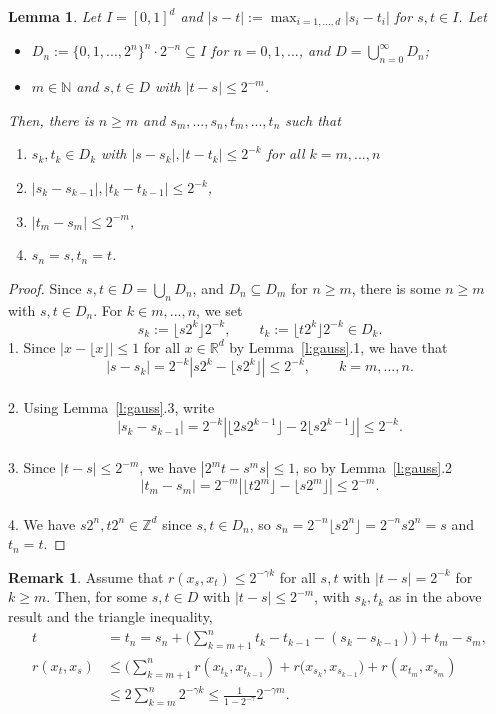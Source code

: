 \documentclass{article}
\newtheorem{lemma}[proposition]{Lemma}
\theoremstyle{definition}
\newtheorem{remark}[proposition]{Remark}
\theoremstyle{step} \newtheorem{step}{Step}
\begin{document}
\begin{lemma}
  Let $I = [0,1]^d$ and $|s-t| := \max_{i=1,...,d} |s_i - t_i|$ for
  $s,t\in I$. Let
  \begin{itemize}
    \item $D_n := \{0,1,...,2^n\}^n \cdot 2^{-n} \subseteq I$ for
          $n=0,1,...$, and $D =\bigcup_{n=0}^\infty D_n$;
    \item $m \in \mathbb N$ and $s,t \in D$ with $|t-s| \leq 2^{-m}$.
  \end{itemize}
  Then, there is $n \geq m$ and $s_m,...,s_n, t_m,...,t_n$ such that
  \begin{enumerate}
    \item $s_k, t_k \in D_k$ with $|s-s_k|, |t-t_k| \leq 2^{-k}$ for all
          $k=m,...,n$
    \item $|s_k - s_{k-1}|, |t_k - t_{k-1}| \leq 2^{-k}$,
    \item $|t_m - s_m| \leq 2^{-m}$,
    \item $s_n=s, t_n=t$.
  \end{enumerate}
\end{lemma}

\begin{proof}
  Since $s,t \in D = \bigcup_n D_n$, and $D_n \subseteq D_m$ for
  $n\geq m$, there is some $n \geq m$ with $s,t\in D_n$. For $k \in
    m,...,n$, we set
  $$s_k := \lfloor s2^k\rfloor 2^{-k}, \qquad t_k := \lfloor
    t2^k\rfloor 2^{-k} \in D_k.$$ 1.  Since $|x - \lfloor x \rfloor |
    \leq 1$ for all $x \in \mathbb R^d$ by Lemma~\ref{l:gauss}.1, we have that
  $$|s - s_k| = 2^{-k}|s2^k - \lfloor s2^k\rfloor| \leq 2^{-k}, \qquad
    k=m,...,n.$$ \\ 2. Using Lemma~\ref{l:gauss}.3, write
  $$ |s_k - s_{k-1}| = 2^{-k} | \lfloor 2s2^{k-1}\rfloor - 2\lfloor
    s2^{k-1}\rfloor| \leq 2^{-k}.$$ \\ 3. Since  $|t-s| \leq
    2^{-m}$, we have $|2^mt - s^ms| \leq 1$, so by Lemma~\ref{l:gauss}.2
  $$ |t_m - s_m| = 2^{-m} | \lfloor t2^m\rfloor - \lfloor s2^m
    \rfloor| \leq 2^{-m}.$$ \\ 4. We have $s2^n, t2^n \in \mathbb Z^d$
  since $s,t \in D_n$, so $s_n = 2^{-n} \lfloor s2^n\rfloor = 2^{-n} s
    2^n = s$ and $t_n = t$.
\end{proof}

\begin{remark}\label{rem1}
  Assume that $r(x_s, x_t) \leq 2^{-\gamma k}$ for all $s,t$ with
  $|t-s| = 2^{-k}$ for $k\geq m$. Then, for some $s,t\in D$ with
  $|t-s| \leq 2^{-m}$, with $s_k, t_k$ as in the above result and the
  triangle inequality,
  \begin{align*}
    t & = t_n = s_n + \Big(\sum_{k=m+1}^n t_k - t_{k-1} -(s_k -
    s_{k-1})\Big) + t_m - s_m,                                  \\ r(x_t, x_s) & \leq
    \Big(\sum_{k=m+1}^n r(x_{t_k}, x_{t_{k-1}}) + r(x_{s_k},
    x_{s_{k-1}}\Big) + r(x_{t_m}, x_{s_m})                      \\ & \leq 2 \sum_{k=m}^n
    2^{-\gamma k} \leq \tfrac{1}{1-2^{-\gamma}} 2^{-\gamma m}.
  \end{align*}
\end{remark}
\end{document}
